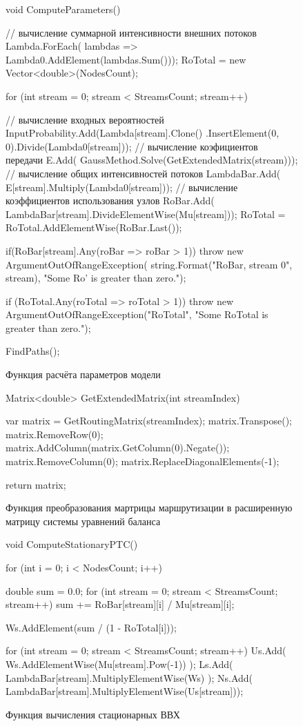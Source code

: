 \documentclass[oneside, final, 14pt, a4paper]{extreport}
\begin{document}
\begin{figure}[h!]
    \begin{listing}{1}
void ComputeParameters()
{
  // вычисление суммарной интенсивности внешних потоков
  Lambda.ForEach(
	lambdas => Lambda0.AddElement(lambdas.Sum())); 
  RoTotal = new Vector<double>(NodesCount);

  for (int stream = 0; stream < StreamsCount; stream++)
  {
	// вычисление входных вероятностей
	InputProbability.Add(Lambda[stream].Clone()
	  .InsertElement(0, 0).Divide(Lambda0[stream]));
	// вычисление коэфициентов передачи
	E.Add(
	  GaussMethod.Solve(GetExtendedMatrix(stream)));
	// вычисление общих интенсивностей потоков
	LambdaBar.Add(
	  E[stream].Multiply(Lambda0[stream]));
	// вычисление коэффициентов использования узлов
	RoBar.Add(
	  LambdaBar[stream].DivideElementWise(Mu[stream]));
	RoTotal = RoTotal.AddElementWise(RoBar.Last());
	
  	if(RoBar[stream].Any(roBar => roBar > 1))
	  throw new ArgumentOutOfRangeException(
	  string.Format("RoBar, stream {0}", stream),
	  "Some Ro' is greater than zero.");
  }
  if (RoTotal.Any(roTotal => roTotal > 1))
	throw new ArgumentOutOfRangeException("RoTotal",
	"Some RoTotal is greater than zero.");
	
	FindPaths();
}\end{listing}
	
	\caption{Функция расчёта параметров модели}
	\label{pic:function_computeParameters}
\end{figure}

\begin{figure}[h!]
    \begin{listing}{1}
Matrix<double> GetExtendedMatrix(int streamIndex)
{
  var matrix = GetRoutingMatrix(streamIndex);
  matrix.Transpose();
  matrix.RemoveRow(0);
  matrix.AddColumn(matrix.GetColumn(0).Negate());
  matrix.RemoveColumn(0);
  matrix.ReplaceDiagonalElements(-1);

  return matrix;
}\end{listing}
    
    \caption{Функция преобразования мартрицы маршрутизации в расширенную матрицу системы уравнений баланса}
    \label{pic:functions_getextendedmatrix}
\end{figure}

\begin{figure}[h!]
	\begin{listing}{1}
void ComputeStationaryPTC()
{
  for (int i = 0; i < NodesCount; i++)
  {
	double sum = 0.0;
	for (int stream = 0; stream < StreamsCount; stream++)
	  sum += RoBar[stream][i] / Mu[stream][i];

	Ws.AddElement(sum / (1 - RoTotal[i]));
  }

  for (int stream = 0; stream < StreamsCount; stream++)
  {
	Us.Add( Ws.AddElementWise(Mu[stream].Pow(-1)) );
	Ls.Add(
	  LambdaBar[stream].MultiplyElementWise(Ws) );
	Ns.Add(
	  LambdaBar[stream].MultiplyElementWise(Us[stream]));
  }
}\end{listing}

	\caption{Функция вычисления стационарных ВВХ}
	\label{pic:function_computeSPTC}
\end{figure}
\end{document}
